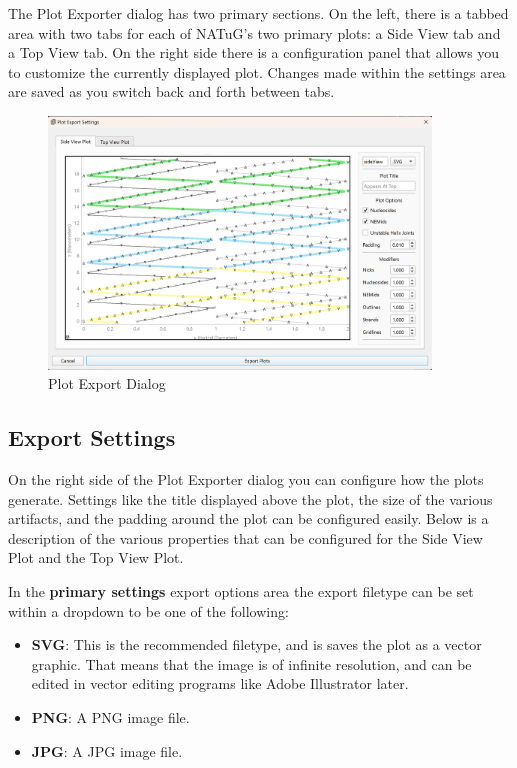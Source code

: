 \documentclass[titlepage]{article}
\begin{document}
The Plot Exporter dialog has two primary sections. On the left, there is a tabbed area with two tabs for each of NATuG's two primary plots: a Side View tab and a Top View tab. On the right side there is a configuration panel that allows you to customize the currently displayed plot. Changes made within the settings area are saved as you switch back and forth between tabs.

\begin{figure} \label{fig:plot-export-dialog}
	\centering
	\caption{Plot Export Dialog}
	\includegraphics[width=4in]{plot-export-dialog.png}
\end{figure}

\subsection{Export Settings}

On the right side of the Plot Exporter dialog you can configure how the plots generate. Settings like the title displayed above the plot, the size of the various artifacts, and the padding around the plot can be configured easily. Below is a description of the various properties that can be configured for the Side View Plot and the Top View Plot.

In the \textbf{primary settings} export options area the export filetype can be set within a dropdown to be one of the following:

\begin{itemize}
	\item \textbf{SVG}: This is the recommended filetype, and is saves the plot as a vector graphic. That means that the image is of infinite resolution, and can be edited in vector editing programs like Adobe Illustrator later.
	\item \textbf{PNG}: A PNG image file.
	\item \textbf{JPG}: A JPG image file.  
\end{itemize}
\end{document}
